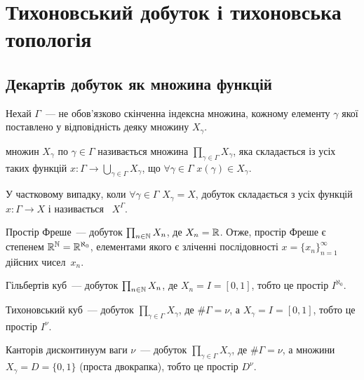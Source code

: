 \newcommand{\CartesianProduct}[1]{\prod_{\gamma\in\Gamma}{#1}_\gamma}
\newcommand{\CartesianNeighbourhood}[1]{U_{K,\{V_\gamma\}_{\gamma\in K}}(#1)}

\chapter{Тихоновський добуток і тихоновська топологія}

\section{Декартів добуток як множина функцій}

Нехай $\Gamma$~--- не обов'язково скінченна індексна множина, кожному елементу $\gamma$ якої поставлено у відповідність деяку множину $X_\gamma$.

\begin{definition}
     множин $X_\gamma$ по $\gamma \in \Gamma$ називається множина $\CartesianProduct{X}$, яка складається із усіх таких функцій $x: \Gamma \to \bigcup_{\gamma \in \Gamma} X_\gamma$, що $\forall \gamma \in \Gamma$ $x(\gamma) \in X_\gamma$.
\end{definition}

\begin{remark}
    У частковому випадку, коли $\forall \gamma \in \Gamma$ $X_\gamma = X$, добуток складається з усіх функцій $x: \Gamma \to X$ і називається ~$X^\Gamma$.
\end{remark}

\begin{example}
    Простір Фреше~--- добуток $\prod_{n \in \mathbb{N}} X_n$, де $X_n = \mathbb{R}$. Отже, простір Фреше є степенем $\mathbb{R}^{\mathbb{N}} = \mathbb{R}^{\aleph_0}$, елементами якого є зліченні послідовності $x = \{x_n\}_{n = 1}^\infty$ дійсних чисел~$x_n$.
\end{example}

\begin{example}
    Гільбертів куб~--- добуток $\prod_{n \in \mathbb{N}} X_n$, де $X_n = I = [0, 1]$, тобто це простір $I^{\aleph_0}$.
\end{example}

\begin{example}
    Тихоновський куб~--- добуток $\CartesianProduct{X}$, де $\# \Gamma = \nu$, а $X_\gamma = I = [0, 1]$, тобто це простір $I^\nu$.
\end{example}

\begin{example}
    Канторів дисконтинуум ваги $\nu$~--- добуток $\CartesianProduct{X}$, де $\#\Gamma = \nu$, а множини $X_\gamma = D = \{0, 1\}$ (проста двокрапка), тобто це простір $D^\nu$.
\end{example}

